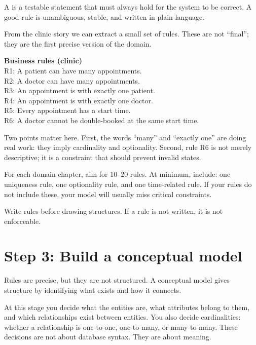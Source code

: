 \begin{definitionbox}
A  is a testable statement that must always hold for the system to be correct.
A good rule is unambiguous, stable, and written in plain language.
\end{definitionbox}

From the clinic story we can extract a small set of rules.
These are not “final”; they are the first precise version of the domain.

\begin{examplebox}
\textbf{Business rules (clinic)}\\
R1: A patient can have many appointments.\\
R2: A doctor can have many appointments.\\
R3: An appointment is with exactly one patient.\\
R4: An appointment is with exactly one doctor.\\
R5: Every appointment has a start time.\\
R6: A doctor cannot be double-booked at the same start time.
\end{examplebox}

Two points matter here.
First, the words “many” and “exactly one” are doing real work: they imply cardinality and optionality.
Second, rule R6 is not merely descriptive; it is a constraint that should prevent invalid states.

\begin{deliverablebox}
For each domain chapter, aim for 10--20 rules.
At minimum, include: one uniqueness rule, one optionality rule, and one time-related rule.
If your rules do not include these, your model will usually miss critical constraints.
\end{deliverablebox}

\begin{principlebox}
Write rules before drawing structures.
If a rule is not written, it is not enforceable.
\end{principlebox}

\section{Step 3: Build a conceptual model}
Rules are precise, but they are not structured.
A conceptual model gives structure by identifying what exists and how it connects.

At this stage you decide what the entities are, what attributes belong to them, and which relationships exist between entities.
You also decide cardinalities: whether a relationship is one-to-one, one-to-many, or many-to-many.
These decisions are not about database syntax.
They are about meaning.

